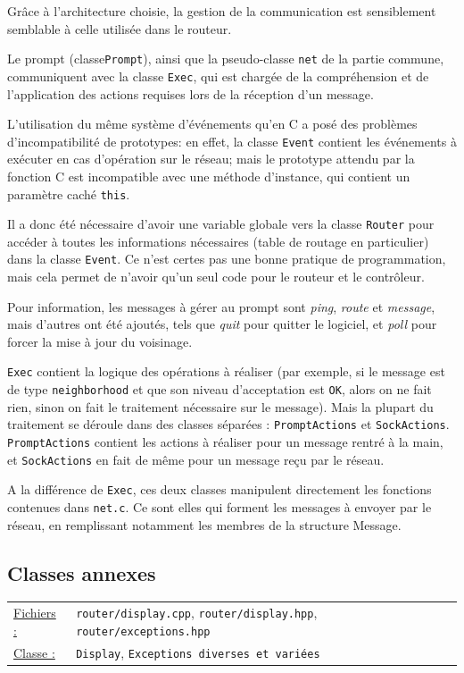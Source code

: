 \documentclass[a4paper,11pt]{article}
\begin{document}
Grâce à l'architecture choisie, la gestion de la communication est sensiblement semblable à celle utilisée dans le routeur.

Le prompt (classe\texttt{Prompt}), ainsi que la pseudo-classe \texttt{net} de la partie commune, communiquent avec la classe \texttt{Exec},
 qui est chargée de la compréhension et de l'application des actions requises lors de la réception d'un message.

L'utilisation du même système d'événements qu'en C a posé des problèmes d'incompatibilité de prototypes: en effet,
la classe \texttt{Event} contient les événements à exécuter en cas d'opération sur le réseau; mais le prototype attendu par la fonction C
est incompatible avec une méthode d'instance, qui contient un paramètre caché \texttt{this}.

Il a donc été nécessaire d'avoir une variable globale vers la classe \texttt{Router} pour accéder à toutes les informations nécessaires (table de routage en particulier) dans la classe \texttt{Event}. Ce n'est certes pas une bonne pratique de programmation, mais cela permet de n'avoir qu'un seul code pour le routeur et le contrôleur.

Pour information, les messages à gérer au prompt sont \textit{ping}, \textit{route} et \textit{message}, mais d'autres ont été ajoutés, tels que \textit{quit} pour quitter le logiciel, et \textit{poll} pour forcer la mise à jour du voisinage.

\texttt{Exec} contient la logique des opérations à réaliser (par exemple, si le message est de type \texttt{neighborhood} et que son niveau d'acceptation est \texttt{OK}, alors on ne fait rien, sinon on fait le traitement nécessaire sur le message). Mais la plupart du traitement se déroule dans des classes séparées : \texttt{PromptActions} et \texttt{SockActions}. \texttt{PromptActions} contient les actions à réaliser pour un message rentré à la main, et \texttt{SockActions} en fait de
même pour un message reçu par le réseau.

A la différence de \texttt{Exec}, ces deux classes manipulent directement les fonctions contenues dans \texttt{net.c}.
Ce sont elles qui forment les messages à envoyer par le réseau, en remplissant notamment les membres de la structure Message.

\subsection{Classes annexes}

\begin{tabularx}{\linewidth}{lX}
\underline{Fichiers :} & \texttt{router/display.cpp}, \texttt{router/display.hpp}, \texttt{router/exceptions.hpp}\\
\underline{Classe :} & \texttt{Display}, \texttt{Exceptions diverses et variées}\\
\end{tabularx}\\
\end{document}
